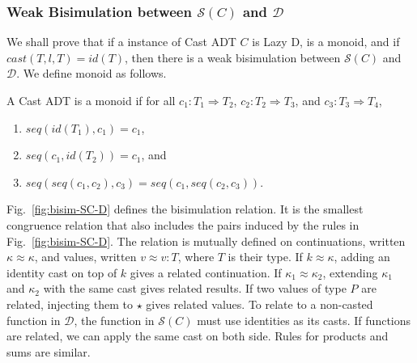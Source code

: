 \documentclass[acmsmall,review,anonymous]{acmart}\settopmatter{printfolios=true,printccs=false,printacmref=false}
\newcommand{\TOOdyn}[0]{\star}
\newcommand{\ineffCEKD}{$\mathcal{D}$}
\newcommand{\effCEK}[1]{$\mathcal{S}(#1)$}
\begin{document}
\subsubsection{Weak Bisimulation between \effCEK{C} and \ineffCEKD{}}

We shall prove that if a instance of Cast ADT $C$ is Lazy D, is a
monoid, and if $cast(T,l,T) = id(T)$, then there is
a weak bisimulation between \effCEK{C} and \ineffCEKD{}.
We define monoid as follows.

\begin{definition}[Monoid]
	A Cast ADT is a monoid if 
	for all
	$c_1 : T_1 \Longrightarrow T_2$,
	$c_2 : T_2 \Longrightarrow T_3$, and
	$c_3 : T_3 \Longrightarrow T_4$,
	\begin{enumerate}
		\item $seq(id(T_1),c_1) = c_1$,
		\item $seq(c_1,id(T_2)) = c_1$, and
		\item $seq(seq(c_1, c_2), c_3) = seq(c_1, seq(c_2, c_3))$.
	\end{enumerate}
\end{definition}



Fig.~\ref{fig:bisim-SC-D} defines the bisimulation relation.  It is
the smallest congruence relation that also includes the pairs induced
by the rules in Fig.~\ref{fig:bisim-SC-D}.
%
The relation is mutually defined on continuations, written $\kappa
\approx \kappa$, and values, written $v \approx v : T$, where $T$ is
their type.
%
If $k \approx \kappa$, adding an identity cast on top of $k$ gives a related 
continuation.
%
%
If $\kappa_1 \approx \kappa_2$, extending $\kappa_1$ and $\kappa_2$ with the 
same cast gives related results.
%
If two values of type $P$ are related, injecting them to $\TOOdyn$ gives 
related values.
%
%
To relate to a non-casted function in \ineffCEKD, the function in \effCEK{C} 
must use identities as its casts.
%
If functions are related, we can apply the same cast on both side.
%
Rules for products and sums are similar.
\end{document}
